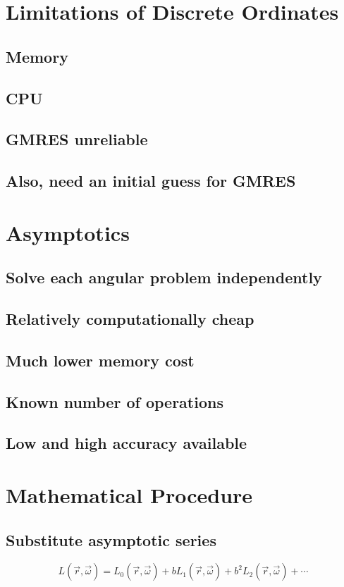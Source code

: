 \documentclass[10pt]{article}
\begin{document}
\section{Limitations of Discrete Ordinates}
\subsection{Memory}
\subsection{CPU}
\subsection{GMRES unreliable}
\subsection{Also, need an initial guess for GMRES}
  
\section{Asymptotics}
\subsection{Solve each angular problem independently}
\subsection{Relatively computationally cheap}
\subsection{Much lower memory cost}
\subsection{Known number of operations}
\subsection{Low and high accuracy available}
  
\section{Mathematical Procedure}
\subsection{Substitute asymptotic series}
\newcommand{\Lasym}{L_0(\vec{r},\vec{\omega}) + b L_1(\vec{r},\vec{\omega}) + b^2 L_2(\vec{r},\vec{\omega}) + \cdots}
\newcommand{\Lasymp}{L_0(\vec{r},\vec{\omega'}) + b L_1(\vec{r},\vec{\omega'}) + b^2 L_2(\vec{r},\vec{\omega'}) + \cdots}
\begin{equation}
  L(\vec{r},\vec{\omega}) = \Lasym
\end{equation}
\end{document}
